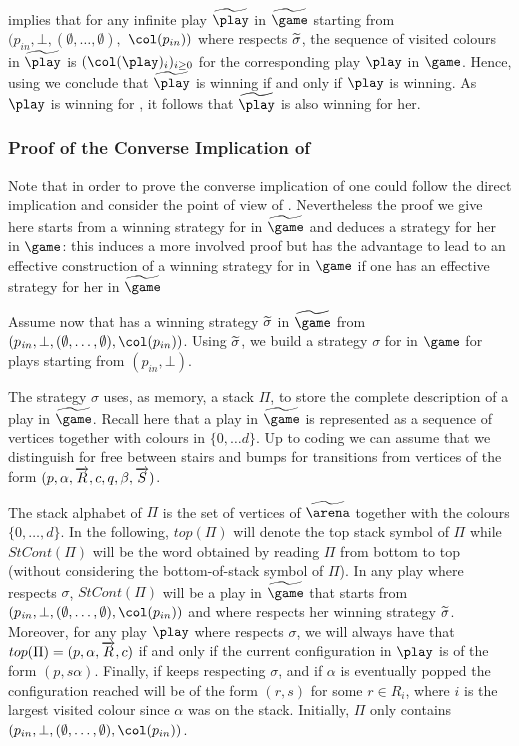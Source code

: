  implies that for any infinite play
$\fplay$ in $\fgame$ starting from
$(p_{in},\bot,(\emptyset,\dots,\emptyset),$ $\pdscol{p_{in}})$
where \Eve respects $\widetilde{\sigma}$, the sequence of visited colours in $\fplay$ is
$(\pdscol{\play}_i)_{i\geq 0}$ for the corresponding play $\play$
in $\game$.
Hence, using  we conclude that
$\fplay$ is winning if
and only if $\play$ is winning. As $\play$
is winning for \Eve, it follows that $\fplay$ is also winning for
her.


\subsubsection{Proof of the Converse Implication of }
\label{10-subsec:strategy-pushdown}

Note that in order to prove the converse implication of  one could follow the direct implication and consider the point of view of \Adam. Nevertheless the proof we give here starts from a winning strategy for \Eve in $\fgame$ and deduces a strategy for her in $\game$: this induces a more involved proof but has the advantage to lead to an effective construction of a winning strategy for \Eve in $\game$ if one has an effective strategy for her in $\fgame$


Assume now that \Eve has a winning strategy $\widetilde{\sigma}$ in $\fgame$
from $(p_{\mathit in},\bot,(\emptyset,\dots,\emptyset),\pdscol{p_{in}})$.
Using $\widetilde{\sigma}$, we build a strategy $\sigma$ for \Eve in
$\game$ for plays starting from $(p_{\mathit in},\bot)$.

The strategy $\sigma$ uses, as memory, a stack $\Pi$, to store the complete
description of a play in $\fgame$. Recall here that a play in
$\fgame$ is represented as a sequence of vertices together with
colours in $\{0,\dots d\}$. Up to coding we can assume that we distinguish for free between stairs and bumps for transitions from vertices of the form $(p,\alpha,\overrightarrow{R},c,q,\beta,\overrightarrow{S})$. %



The stack alphabet of $\Pi$ is the set of vertices of 
$\farena$ together with the colours $\{0,\dots,d\}$. In the following, $top(\Pi)$ will denote
the top stack symbol of $\Pi$ while $StCont(\Pi)$ will be
the word obtained by reading $\Pi$ from bottom to top (without
considering the bottom-of-stack symbol of $\Pi$). In any play
where \Eve respects $\sigma$, $StCont(\Pi)$ will be a play
in $\fgame$ that starts from $(p_{\mathit
in},\bot,(\emptyset,\dots,\emptyset),\pdscol{p_{in}})$ and where
\Eve respects her winning strategy $\widetilde{\sigma}$. Moreover, for any
play $\play$ where \Eve respects $\sigma$, we will always have that
$top(\Pi)=(p,\alpha,\overrightarrow{R},c)$ if and only if
the current configuration in $\play$ is of the form
$(p,s\alpha)$. Finally, if \Eve keeps respecting $\sigma$, and
if $\alpha$  is eventually popped the configuration reached
will be of the form $(r,s)$ for some $r\in R_i$, where
$i$ is the largest visited colour since $\alpha$  was on the stack.
Initially, $\Pi$ only contains $(p_{in},\bot,(\emptyset,\dots,\emptyset),\pdscol{p_{in}})$.

